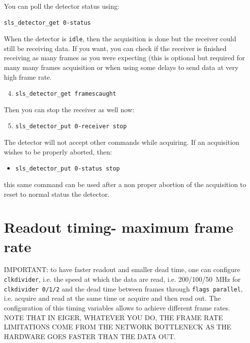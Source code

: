 \documentclass{article}
\begin{document}
You can poll the detector status using:
\begin{verbatim}
sls_detector_get 0-status 
\end{verbatim}
When the detector is {\tt{idle}}, then the acquisition is done but the receiver could still be receiving data. If you want, you can check if the receiver is finished receiving as many frames as you were expecting (this is optional but required for many many frames acquisition or when using some delays to send data at very high frame rate.
\begin{enumerate}
\setcounter{enumi}{3}
\item {\tt{sls\_detector\_get framescaught}} 
\end{enumerate}
Then you can stop the receiver as well now:
\begin{enumerate}
\setcounter{enumi}{4}
\item {\tt{sls\_detector\_put 0-receiver stop}} 
\end{enumerate}

The detector will not accept other commands while acquiring. If an acquisition wishes to be properly aborted, then:
\begin{itemize}
\item {\tt{sls\_detector\_put 0-status stop}} 
\end{itemize}
this same command can be used after a non proper abortion of the acquisition to reset to normal status the detector.

\section{Readout timing- maximum frame rate}\label{timing}
IMPORTANT: to have faster readout and smaller dead time, one can configure {\tt{clkdivider}}, i.e. the speed at which the data are read, i.e. 200/100/50~MHz for {\tt{clkdivider 0/1/2}} and the dead time between frames through {\tt{flags parallel}}, i.e. acquire and read at the same time or acquire and then read out.
The configuration of this timing variables allows to achieve different frame rates. NOTE THAT IN EIGER, WHATEVER YOU DO, THE FRAME RATE LIMITATIONS COME FROM THE NETWORK BOTTLENECK AS THE HARDWARE GOES FASTER THAN THE DATA OUT.
\end{document}
